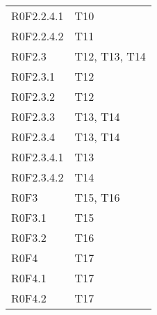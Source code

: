 \begin{longtable}{ll}
R0F2.2.4.1		& T10 \\
R0F2.2.4.2		& T11 \\
R0F2.3			& T12, T13, T14 \\
R0F2.3.1		& T12 \\
R0F2.3.2		& T12 \\
R0F2.3.3		& T13, T14 \\
R0F2.3.4		& T13, T14 \\
R0F2.3.4.1		& T13 \\
R0F2.3.4.2		& T14 \\
R0F3			& T15, T16 \\
R0F3.1			& T15 \\
R0F3.2			& T16 \\
R0F4			& T17 \\
R0F4.1			& T17 \\
R0F4.2			& T17 \\
\end{longtable}